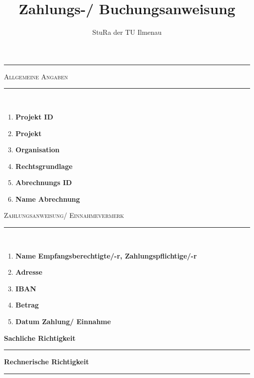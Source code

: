 \documentclass[a4paper,11pt]{article}
\makeatletter
\newcommand{\linia}{\rule{\linewidth}{0.5pt}}
\newcommand{\mysection}[1]{
	\begin{center}
	{\large \textsc{#1}}
	\vspace*{-0.5cm}
	\\\linia\\
	\vspace*{-0.5cm}
	\end{center}
}
\theoremstyle{mytheor}
\renewcommand{\maketitle}{
	\begin{center}
	\vspace*{-0.5cm}
	{\huge \textsc{\@title}}
	\linia
	\end{center}
}
\makeatother
\begin{document}
\title{Zahlungs-/ Buchungsanweisung}
\author{StuRa der TU Ilmenau}

\vspace*{-2.0cm}
\begin{figure}[h]
\centering
\end{figure}

\maketitle

\vspace*{-0.5cm}

\mysection{Allgemeine Angaben}

\begin{enumerate}[label=\Roman*]
\itemsep-2mm
\item \textbf{Projekt ID}\hfill 
\item \textbf{Projekt}\hfill 
\item \textbf{Organisation} \hfill 
\item \textbf{Rechtsgrundlage} \hfill 
\item \textbf{Abrechnungs ID}\hfill 
\item \textbf{Name Abrechnung} \hfill 
\end{enumerate}

\vspace*{2mm}
\mysection{Zahlungsanweisung/ Einnahmevermerk}
\begin{enumerate}[label=\Roman*,resume]
\itemsep-2mm
\item \textbf{Name Empfangsberechtigte/-r, Zahlungspflichtige/-r} \hfill %
\item \textbf{Adresse} \hfill 
\item \textbf{IBAN} \hfill 
\item \textbf{Betrag} \hfill
\vspace{0,5cm} 
\item \textbf{Datum Zahlung/ Einnahme} \hfill %
\end{enumerate}

\vspace{0,5cm}
\parbox[b]{0.4\linewidth}{%
	\strut 
	\textbf{Sachliche Richtigkeit} \\[1.25cm]%
	\hrule
	\vspace{0.25cm}
} 
\hspace{0,5cm} %
\parbox[b]{0.4\linewidth}{%
	\strut 
	\textbf{Rechnerische Richtigkeit} \\[1.25cm]%
	\hrule 
	\vspace{0.25cm}
}
\par\vspace{0,5cm} 
\end{document}
